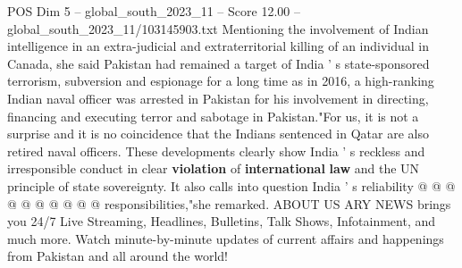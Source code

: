 \begin{textsample}{POS Dim 5 – global\_south\_2023\_11 – Score 12.00 – global\_south\_2023\_11/103145903.txt}
Mentioning the involvement of Indian intelligence in an extra-judicial and extraterritorial killing of an individual in Canada, she said Pakistan had remained a target of India ' s state-sponsored terrorism, subversion and espionage for a long time as in 2016, a high-ranking Indian naval officer was arrested in Pakistan for his involvement in directing, financing and executing terror and sabotage in Pakistan."For us, it is not a surprise and it is no coincidence that the Indians sentenced in Qatar are also retired naval officers.
These developments clearly show India ' s reckless and irresponsible conduct in clear \textbf{violation} of \textbf{international} \textbf{law} and the UN principle of state sovereignty.
It also calls into question India ' s reliability @ @ @ @ @ @ @ @ @ @ responsibilities,"she remarked.
ABOUT US ARY NEWS brings you 24/7 Live Streaming, Headlines, Bulletins, Talk Shows, Infotainment, and much more.
Watch minute-by-minute updates of current affairs and happenings from Pakistan and all around the world!

\end{textsample}
